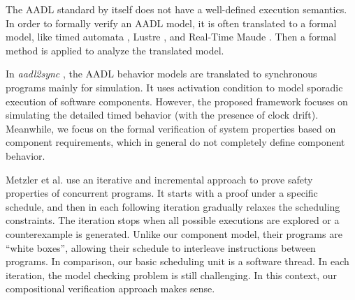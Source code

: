 The AADL standard by itself does not have a well-defined execution semantics. In order to formally verify an AADL model, it is often translated to a formal model, like timed automata \cite{behaviorAnnex}, Lustre \cite{AADL2Sync}, and Real-Time Maude \cite{maude}. Then a formal method is applied to analyze the translated model. 

In \emph{aadl2sync} \cite{AADL2Sync}, the AADL behavior models are translated to synchronous programs mainly for simulation. It uses activation condition to model sporadic execution of software components. However, the proposed framework focuses on simulating the detailed timed behavior (with the presence of clock drift). Meanwhile, we focus on the formal verification of system properties based on component requirements, which in general do not completely define component behavior.

Metzler et al. \cite{Metzler2020} use an iterative and incremental approach to prove safety properties of concurrent programs. It starts with a proof under a specific schedule, and then in each following iteration gradually relaxes the scheduling constraints. The iteration stops when all possible executions are explored or a counterexample is generated. Unlike our component model, their programs are ``white boxes'', allowing their schedule to interleave instructions between programs. In comparison, our basic scheduling unit is a software thread. In each iteration, the model checking problem is still challenging. In this context, our compositional verification approach makes sense.

